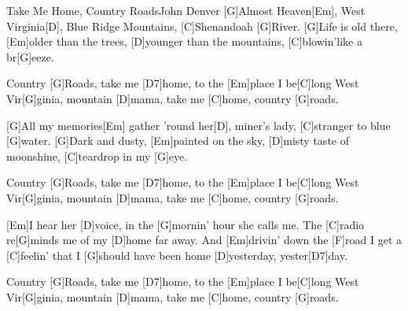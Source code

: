 \documentclass[../main.tex]{subfiles}
\begin{document}
\begin{song}[2]{Take Me Home, Country Roads}{John Denver}{}
[G]Almost Heaven[Em], West Virginia[D], Blue Ridge Mountains, [C]Shenandoah [G]River.
[G]Life is old there, [Em]older than the trees, [D]younger than the mountains, [C]blowin'like a br[G]eeze.

Country [G]Roads, take me [D7]home, to the [Em]place I be[C]long
West Vir[G]ginia, mountain [D]mama, take me [C]home, country [G]roads.

[G]All my memories[Em]  gather 'round her[D], miner's lady, [C]stranger to blue [G]water.
[G]Dark and dusty, [Em]painted on the sky, [D]misty taste of moonshine, [C]teardrop in my [G]eye.

Country [G]Roads, take me [D7]home, to the [Em]place I be[C]long
West Vir[G]ginia, mountain [D]mama, take me [C]home, country [G]roads.

[Em]I hear her [D]voice, in the [G]mornin' hour she calls me.
The [C]radio re[G]minds me of my [D]home far away.
And [Em]drivin' down the [F]road I get a [C]feelin' that I [G]should have been home [D]yesterday, yester[D7]day.

Country [G]Roads, take me [D7]home, to the [Em]place I be[C]long
West Vir[G]ginia, mountain [D]mama, take me [C]home, country [G]roads.
\end{song}
\end{document}
